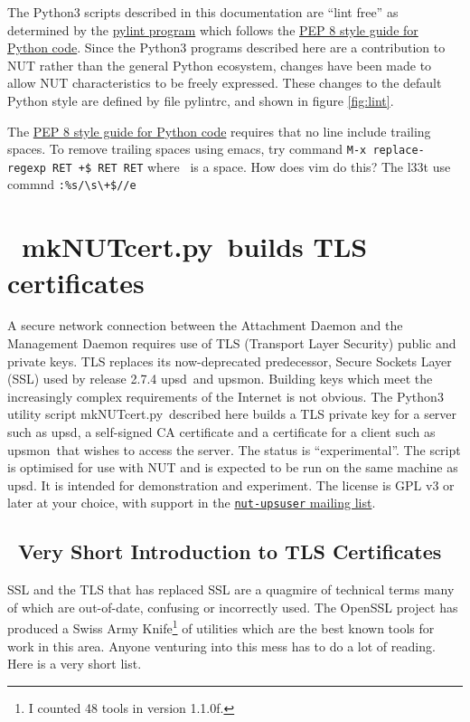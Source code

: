 \documentclass[12pt]{article}
\newlength{\headersep}\setlength{\headersep}{3mm}
\newcommand{\Hsep}{\hspace{\headersep}}
\newcommand{\newcolumn}{\vfill\eject}
\newcommand{\upsd}{\mbox{\textcolor{UPSDCOLOUR}{upsd}}}
\newcommand{\upsmon}{\mbox{\textcolor{MONCOLOUR}{upsmon}}}
\newcommand{\mkNUTcert}{\mbox{\textcolor{MKNUTCERTCOLOUR}{mkNUTcert.py}}}
\newcommand{\pylintrc}{\mbox{\textcolor{NUTCOLOUR}{pylintrc}}}
\newcommand{\mailinglist}{\href{https://lists.alioth.debian.org/mailman/listinfo/nut-upsuser}%
                               {\texttt{nut-upsuser} mailing list}}
\begin{document}
The Python3 scripts described in this documentation are ``lint free''
as determined by the \href{https://www.pylint.org/}{pylint program}
which follows the \href{https://www.python.org/dev/peps/pep-0008/}{PEP
  8 style guide for Python code}.  Since the Python3 programs
described here are a contribution to NUT rather than the general
Python ecosystem, changes have been made to allow NUT characteristics
to be freely expressed.  These changes to the default Python style are
defined by file \pylintrc, and shown in figure \ref{fig:lint}.

The \href{https://www.python.org/dev/peps/pep-0008/}{PEP 8 style guide
  for Python code} requires that no line include trailing spaces.  To
remove trailing spaces using emacs, try command
\verb`M-x replace-regexp RET `\textvisiblespace\verb`+$ RET RET`
where \textvisiblespace\ is a space.  How does vim do this?  The l33t
use commnd \verb`:%s/\s\+$//e`


\newcolumn
\section{\Hsep\ \mkNUTcert\ builds TLS certificates}\label{section:TLS}

A secure network connection between the Attachment Daemon and the
Management Daemon requires use of TLS (Transport Layer Security)
public and private keys.  TLS replaces its now-deprecated predecessor,
Secure Sockets Layer (SSL) used by release 2.7.4 \upsd\ and \upsmon.
Building keys which meet the increasingly complex requirements of the
Internet is not obvious.  The Python3 utility script
\mkNUTcert\ described here builds a TLS private key for a server such
as \upsd, a self-signed CA certificate and a certificate for a client
such as \upsmon\ that wishes to access the server. The status is
``experimental''.  The script is optimised for use with NUT and is
expected to be run on the same machine as \upsd.  It is intended for
demonstration and experiment.  The license is GPL v3 or later at your
choice, with support in the \mailinglist.


\subsection{\Hsep\ Very Short Introduction to TLS Certificates}\label{section:TLS.intro}

SSL and the TLS that has replaced SSL are a quagmire of technical terms many
of which are out-of-date, confusing or incorrectly used.  The OpenSSL project
has produced a Swiss Army Knife\footnote{I counted 48 tools in version
  1.1.0f.} of utilities which are the best known tools for work in this area.
Anyone venturing into this mess has to do a lot of reading.  Here is a very
short list.
\end{document}

